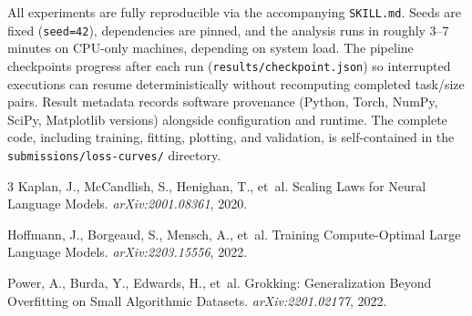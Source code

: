 \documentclass[11pt,a4paper]{article}
\begin{document}
All experiments are fully reproducible via the accompanying \texttt{SKILL.md}.
Seeds are fixed (\texttt{seed=42}), dependencies are pinned, and the analysis runs in roughly 3--7 minutes on CPU-only machines, depending on system load.
The pipeline checkpoints progress after each run (\texttt{results/checkpoint.json}) so interrupted executions can resume deterministically without recomputing completed task/size pairs.
Result metadata records software provenance (Python, Torch, NumPy, SciPy, Matplotlib versions) alongside configuration and runtime.
The complete code, including training, fitting, plotting, and validation, is self-contained in the \texttt{submissions/loss-curves/} directory.


\begin{thebibliography}{3}
Kaplan, J., McCandlish, S., Henighan, T., et~al.
\newblock Scaling Laws for Neural Language Models.
\newblock \emph{arXiv:2001.08361}, 2020.

Hoffmann, J., Borgeaud, S., Mensch, A., et~al.
\newblock Training Compute-Optimal Large Language Models.
\newblock \emph{arXiv:2203.15556}, 2022.

Power, A., Burda, Y., Edwards, H., et~al.
\newblock Grokking: Generalization Beyond Overfitting on Small Algorithmic Datasets.
\newblock \emph{arXiv:2201.02177}, 2022.
\end{thebibliography}
\end{document}
